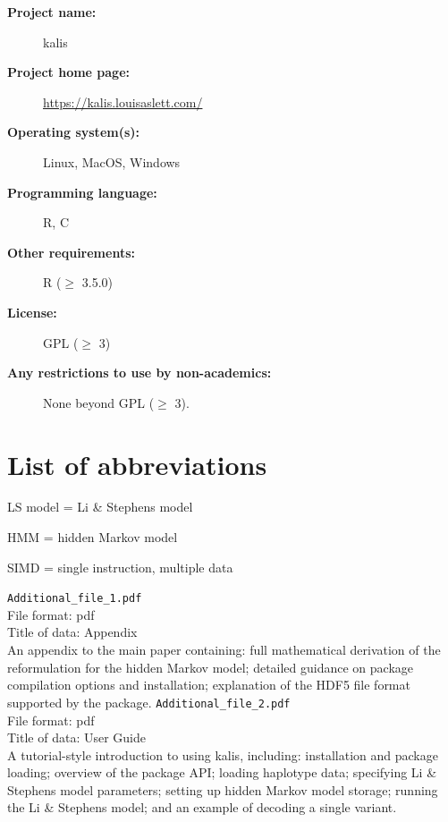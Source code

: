 \documentclass[pdflatex,referee,lineno,sn-nature]{sn-jnl}%
\let\proglang=\textsf
\newcommand{\pkg}[1]{{\fontseries{m}\fontseries{b}\selectfont #1}}
\begin{document}
\begin{description}
	\item[\textbf{Project name:}] \pkg{kalis}
	\item[\textbf{Project home page:}] \url{https://kalis.louisaslett.com/}
	\item[\textbf{Operating system(s):}] Linux, MacOS, Windows
	\item[\textbf{Programming language:}] \proglang{R}, \proglang{C}
	\item[\textbf{Other requirements:}] R ($\geq$ 3.5.0)
	\item[\textbf{License:}] GPL ($\geq$ 3)
	\item[\textbf{Any restrictions to use by non-academics:}] None beyond GPL ($\geq$ 3).
\end{description}



\section*{List of abbreviations}

\noindent
LS model = Li \& Stephens model

\noindent
HMM = hidden Markov model

\noindent
SIMD = single instruction, multiple data



\backmatter


\texttt{Additional\_file\_1.pdf}\\
File format: pdf \\
Title of data: Appendix \\
An appendix to the main paper containing: full mathematical derivation of the reformulation for the hidden Markov model; detailed guidance on package compilation options and installation; explanation of the HDF5 file format supported by the package.
\texttt{Additional\_file\_2.pdf}\\
File format: pdf \\
Title of data: User Guide \\
A tutorial-style introduction to using \pkg{kalis}, including: installation and package loading; overview of the package API; loading haplotype data; specifying Li \& Stephens model parameters; setting up hidden Markov model storage; running the Li \& Stephens model; and an example of decoding a single variant.
\end{document}
